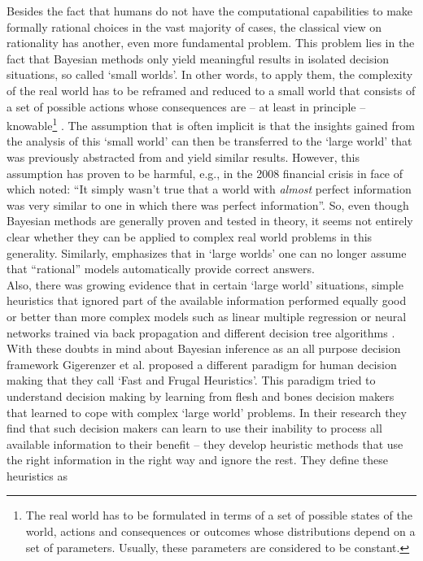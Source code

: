 Besides the fact that humans do not have the computational capabilities to make formally rational choices in the vast majority of cases, the classical view on rationality has another, even more fundamental problem. This problem lies in the fact that Bayesian methods only yield meaningful results in isolated decision situations, so called `small worlds'. In other words, to apply them, the complexity of the real world has to be reframed and reduced to a small world that consists of a set of possible actions whose consequences are -- at least in principle -- knowable\footnote{The real world has to be formulated in terms of a set of possible states of the world, actions and consequences or outcomes whose distributions depend on a set of parameters. Usually, these parameters are considered to be constant.} \citep[for an elaboration see p. 82 ff.][]{savage1972foundations}. The assumption that is often implicit is that the insights gained from the analysis of this `small world' can then be transferred to the `large world' that was previously abstracted from and yield similar results. However, this assumption has proven to be harmful, e.g., in the 2008 financial crisis in face of which \cite{Stiglitz2010} noted: ``It simply wasn't true that a world with \emph{almost} perfect information was very similar to one in which there was perfect information''. So, even though Bayesian methods are generally proven and tested in theory, it seems not entirely clear whether they can be applied to complex real world problems in this generality.
Similarly, \cite{binmore2008rational} emphasizes that in `large worlds' one can no longer assume that ``rational'' models automatically provide correct answers.\\
Also, there was growing evidence that in certain `large world' situations, simple heuristics that ignored part of the available information performed equally good or better than more complex models such as linear multiple regression \citep{Czerlinski1999} or neural networks trained via back propagation and different decision tree algorithms \citep{Chater2003, Brighton2006}.\\

With these doubts in mind about Bayesian inference as an all purpose decision framework Gigerenzer et al. proposed a different paradigm for human decision making that they call `Fast and Frugal Heuristics'. 
This paradigm tried to understand decision making by learning from flesh and bones decision makers that learned to cope with complex `large world' problems. In their research they find that such decision makers can learn to use their inability to process all available information to their benefit -- they develop heuristic methods that use the right information in the right way and ignore the rest. They define these heuristics as
\\

